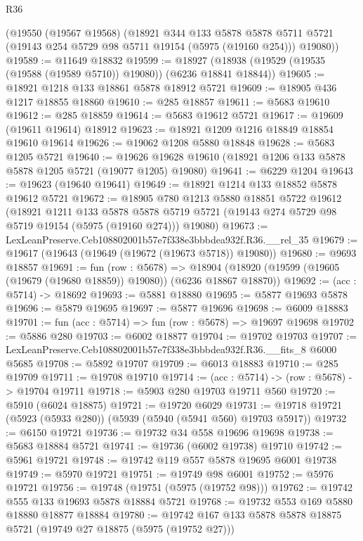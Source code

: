 \begin{lexlean}{R36}
\begin{coremodule}
    (@19550
      (@19567 @19568)
      (@18921
        @344
        @133
        @5878
        @5878
        @5711
        @5721
        (@19143 @254 @5729 @98 @5711 @19154 (@5975 (@19160 @254)))
        @19080))
@19589 := @11649 @18832
@19599 := @18927 (@18938 (@19529 (@19535 (@19588 (@19589 @5710)) @19080)) (@6236 @18841 @18844))
@19605 := @18921 @1218 @133 @18861 @5878 @18912 @5721
@19609 := @18905 @436 @1217 @18855 @18860
@19610 := @285 @18857
@19611 := @5683 @19610
@19612 := @285 @18859
@19614 := @5683 @19612 @5721
@19617 := @19609 (@19611 @19614) @18912
@19623 := @18921 @1209 @1216 @18849 @18854 @19610 @19614
@19626 := @19062 @1208 @5880 @18848
@19628 := @5683 @1205 @5721
@19640 := @19626 @19628 @19610 (@18921 @1206 @133 @5878 @5878 @1205 @5721 (@19077 @1205) @19080)
@19641 := @6229 @1204
@19643 := @19623 (@19640 @19641)
@19649 := @18921 @1214 @133 @18852 @5878 @19612 @5721
@19672 := @18905
    @780
    @1213
    @5880
    @18851
    @5722
    @19612
    (@18921
      @1211
      @133
      @5878
      @5878
      @5719
      @5721
      (@19143 @274 @5729 @98 @5719 @19154 (@5975 (@19160 @274)))
      @19080)
@19673 := LexLeanPreserve.Ceb108802001b57e7f338e3bbbdea932f.R36.__rel_35
@19679 := @19617 (@19643 (@19649 (@19672 (@19673 @5718)) @19080))
@19680 := @9693 @18857
@19691 := fun (row : @5678) =>
  @18904 (@18920 (@19599 (@19605 (@19679 (@19680 @18859)) @19080)) (@6236 @18867 @18870))
@19692 := (acc : @5714) -> @18692
@19693 := @5881 @18880
@19695 := @5877 @19693 @5878
@19696 := @5879 @19695
@19697 := @5877 @19696
@19698 := @6009 @18883
@19701 := fun (acc : @5714) => fun (row : @5678) => @19697 @19698
@19702 := @5886 @280
@19703 := @6002 @18877
@19704 := @19702 @19703
@19707 := LexLeanPreserve.Ceb108802001b57e7f338e3bbbdea932f.R36.__fits_8 @6000 @5685
@19708 := @5892 @19707
@19709 := @6013 @18883
@19710 := @285 @19709
@19711 := @19708 @19710
@19714 := (acc : @5714) -> (row : @5678) -> @19704 @19711
@19718 := @5903 @280 @19703 @19711 @560
@19720 := @5910 (@6024 @18875)
@19721 := @19720 @6029
@19731 := @19718 @19721 (@5923 (@5933 @280)) (@5939 (@5940 (@5941 @560) @19703 @5917))
@19732 := @6150 @19721
@19736 := @19732 @34 @558 @19696 @19698
@19738 := @5683 @18884 @5721
@19741 := @19736 (@6002 @19738) @19710
@19742 := @5961 @19721
@19748 := @19742 @119 @557 @5878 @19695 @6001 @19738
@19749 := @5970 @19721
@19751 := @19749 @98 @6001
@19752 := @5976 @19721
@19756 := @19748 (@19751 (@5975 (@19752 @98)))
@19762 := @19742 @555 @133 @19693 @5878 @18884 @5721
@19768 := @19732 @553 @169 @5880 @18880 @18877 @18884
@19780 := @19742 @167 @133 @5878 @5878 @18875 @5721 (@19749 @27 @18875 (@5975 (@19752 @27)))

\end{coremodule}
\end{lexlean}
